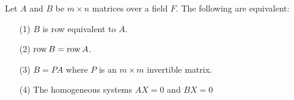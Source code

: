 \begin{theorem}\label{2.7.4}
    Let $A$ and  $B$ be  $m \times n$ matrices over a field  $F$. The following
    are equivalent:
        \begin{enumerate}
            \item[(1)] $B$ is row equivalent to  $A$.		

            \item[(2)] $\operatorname{row}{B}=\operatorname{row}{A}$.
                
            \item[(3)] $B=PA$ where  $P$ is an  $m \times m$ invertible matrix.

            \item [(4)] The homogeneous systems $AX=0$ and  $BX=0$
        \end{enumerate}
\end{theorem}
